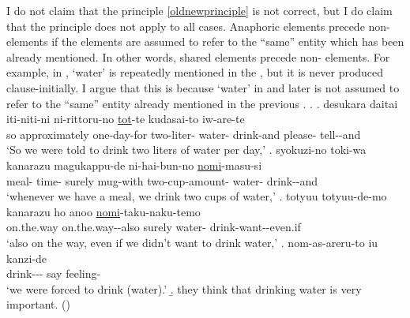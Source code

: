 I do not claim that the principle \ref{oldnewprinciple} is not correct,
but I do claim that the principle does not apply to all cases.
Anaphoric elements precede non- elements
if the  elements are assumed to refer to the ``same'' entity which has been already mentioned.
In other words,
shared elements precede non- elements.
For example, in \Next,
 `water' is repeatedly mentioned in the ,
but it is never produced clause-initially.
I argue that this is because
 `water' in \Next[b] and later is not assumed to refer to the ``same'' entity already mentioned in the previous .
%
\ex.\label{WO:ClauseInit:Given:mizu}
 \ag. desukara daitai iti-niti-ni ni-rittoru-no  \ul{tot}-te kudasai-to iw-are-te \\
 so approximately one-day-for two-liter- water- drink-and please- tell--and \\
 `So we were told to drink two liters of water per day,'
 \bg. syokuzi-no toki-wa kanarazu magukappu-de ni-hai-bun-no  \ul{nomi}-masu-si \\
 	meal- time- surely mug-with two-cup-amount- water- drink--and \\
	`whenever we have a meal, we drink two cups of water,'
 \bg. totyuu totyuu-de-mo kanarazu  ho anoo \ul{nomi}-taku-naku-temo \\
 		on.the.way on.the.way--also surely water-   drink-want--even.if \\
		`also on the way, even if we didn't want to drink water,'
 \bg. nom-as-areru-to iu kanzi-de \\
 	drink--- say feeling- \\
	`we were forced to drink (water).'
 \b. they think that drinking water is very important.
  \hfill{()}


